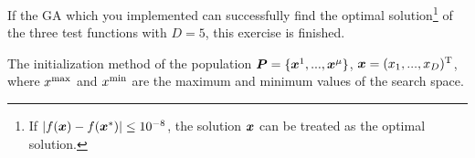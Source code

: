 \documentclass[11pt]{article}
\def\vector#1{\mbox{\boldmath $#1$}}
\def\vector#1{\mbox{\boldmath $#1$}}
\begin{document}
If the GA which you implemented can successfully find the optimal solution\footnote{If $|f(\vector{x}) - f(\vector{x}^{*})| \leq 10^{-8}$, the solution $\vector{x}$ can be treated as the optimal solution.} of the three test functions with $D = 5$, this exercise is finished.



\IncMargin{0.5em}
\begin{algorithm}[t]
{}
\SetSideCommentRight
{}
\caption{The initialization method of the population $\vector{P} = \{\vector{x}^1, ..., \vector{x}^{\mu}\}$, $\vector{x} = (x_1, ..., x_D)^{\rm T}$, where $x^{\rm max}$ and $x^{\rm min}$ are the maximum and minimum values of the search space.}
\label{alg:initialization_cop}
\end{algorithm}\DecMargin{0.5em}






\end{document}
